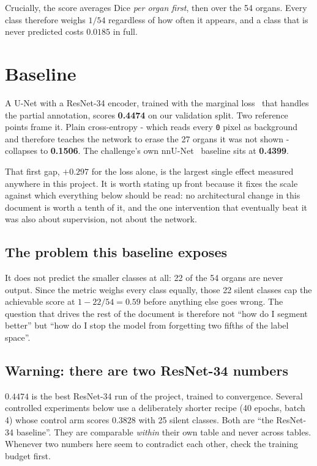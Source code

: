 \documentclass{article}
\newcounter{exper}
\begin{document}
\noindent Crucially, the score averages Dice \emph{per organ first}, then over the 54
organs. Every class therefore weighs $1/54$ regardless of how often it appears,
and a class that is never predicted costs $0.0185$ in full.

\newpage

\section{Baseline}
\label{sec:baseline}

A U-Net with a ResNet-34 encoder, trained with the marginal loss~\cite{marginal}
that handles the partial annotation, scores \textbf{0.4474} on our validation split. Two
reference points frame it. Plain cross-entropy - which reads every \texttt{0}
pixel as background and therefore teaches the network to erase the 27 organs it
was not shown - collapses to \textbf{0.1506}. The challenge's own
nnU-Net~\cite{nnunet} baseline sits at \textbf{0.4399}.

\vspace{2.0mm}

\noindent That first gap, $+0.297$ for the loss alone, is the largest single
effect measured anywhere in this project. It is worth stating up front because it
fixes the scale against which everything below should be read: no architectural
change in this document is worth a tenth of it, and the one intervention that
eventually beat it was also about supervision, not about the network.

\subsection{The problem this baseline exposes}

It does not predict the smaller classes at all: 22 of the 54 organs are never
output. Since the metric weighs every class equally, those 22 silent classes cap
the achievable score at $1 - 22/54 = 0.59$ before anything else goes wrong. The
question that drives the rest of the document is therefore not ``how do I segment
better'' but ``how do I stop the model from forgetting two fifths of the label
space''.

\subsection{Warning: there are two ResNet-34 numbers}

$0.4474$ is the best ResNet-34 run of the project, trained to convergence. Several
controlled experiments below use a deliberately shorter recipe (40 epochs, batch
4) whose control arm scores $0.3828$ with 25 silent classes. Both are ``the
ResNet-34 baseline''. They are comparable \emph{within} their own table and never
across tables. Whenever two numbers here seem to contradict each other, check the
training budget first.
\end{document}
